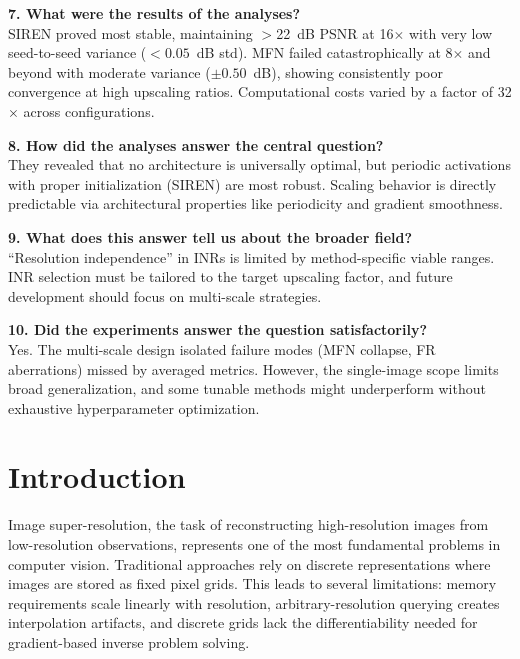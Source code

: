 \documentclass[a4paper,oneside,10pt,ngerman,english]{scrartcl}
\begin{document}
\vspace{0.3cm}
\textbf{7. What were the results of the analyses?} \\
SIREN proved most stable, maintaining $>$22~dB PSNR at 16$\times$ with very low seed-to-seed variance ($<0.05$~dB std). MFN failed catastrophically at 8$\times$ and beyond with moderate variance ($\pm 0.50$~dB), showing consistently poor convergence at high upscaling ratios. Computational costs varied by a factor of 32$\times$ across configurations.

\vspace{0.3cm}
\textbf{8. How did the analyses answer the central question?} \\
They revealed that no architecture is universally optimal, but periodic activations with proper initialization (SIREN) are most robust. Scaling behavior is directly predictable via architectural properties like periodicity and gradient smoothness.

\vspace{0.3cm}
\textbf{9. What does this answer tell us about the broader field?} \\
``Resolution independence'' in INRs is limited by method-specific viable ranges. INR selection must be tailored to the target upscaling factor, and future development should focus on multi-scale strategies.

\vspace{0.3cm}
\textbf{10. Did the experiments answer the question satisfactorily?} \\
Yes. The multi-scale design isolated failure modes (MFN collapse, FR aberrations) missed by averaged metrics. However, the single-image scope limits broad generalization, and some tunable methods might underperform without exhaustive hyperparameter optimization.


\cleardoubleoddpage

\section{Introduction}
\label{sec:introduction}

Image super-resolution, the task of reconstructing high-resolution images from low-resolution observations, represents one of the most fundamental problems in computer vision. Traditional approaches rely on discrete representations where images are stored as fixed pixel grids. This leads to several limitations: memory requirements scale linearly with resolution, arbitrary-resolution querying creates interpolation artifacts, and discrete grids lack the differentiability needed for gradient-based inverse problem solving.
\end{document}

